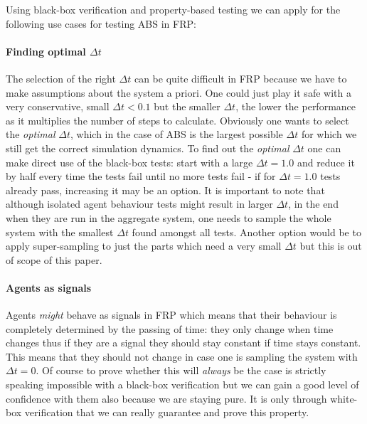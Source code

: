 
Using black-box verification and property-based testing we can apply for the following use cases for testing ABS in FRP:

\paragraph{Finding optimal $\Delta t$}
The selection of the right $\Delta t$ can be quite difficult in FRP because we have to make assumptions about the system a priori. One could just play it safe with a very conservative, small $\Delta t < 0.1$ but the smaller $\Delta t$, the lower the performance as it multiplies the number of steps to calculate. Obviously one wants to select the \textit{optimal} $\Delta t$, which in the case of ABS is the largest possible $\Delta t$ for which we still get the correct simulation dynamics.
To find out the \textit{optimal} $\Delta t$ one can make direct use of the black-box tests: start with a large $\Delta t = 1.0$ and reduce it by half every time the tests fail until no more tests fail - if for $\Delta t = 1.0$ tests already pass, increasing it may be an option. It is important to note that although isolated agent behaviour tests might result in larger $\Delta t$, in the end when they are run in the aggregate system, one needs to sample the whole system with the smallest $\Delta t$ found amongst all tests. Another option would be to apply super-sampling to just the parts which need a very small $\Delta t$ but this is out of scope of this paper.

\paragraph{Agents as signals}
Agents \textit{might} behave as signals in FRP which means that their behaviour is completely determined by the passing of time: they only change when time changes thus if they are a signal they should stay constant if time stays constant. This means that they should not change in case one is sampling the system with $\Delta t = 0$. Of course to prove whether this will \textit{always} be the case is strictly speaking impossible with a black-box verification but we can gain a good level of confidence with them also because we are staying pure. It is only through white-box verification that we can really guarantee and prove this property.

